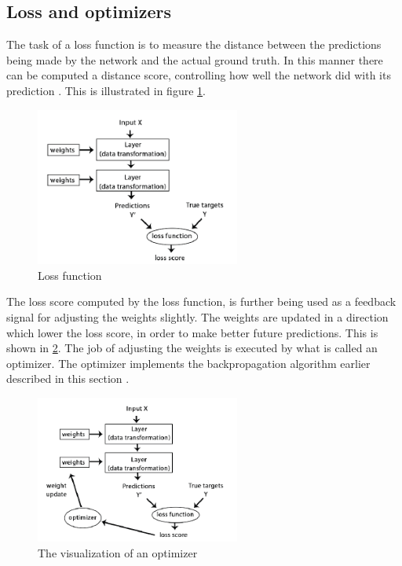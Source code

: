 \documentclass[USenglish]{ifimaster}  %
\begin{document}
\subsection{Loss and optimizers}
The task of a loss function is to measure the distance between the predictions being made by the network and the actual ground truth. In this manner there can be computed a distance score, controlling how well the network did with its prediction \cite{Francois_Deep_learning_with_python}. This is illustrated in figure \cref{fig:loss_function}.

\begin{figure}[ht]
    \centering
    \includegraphics[width=0.6\textwidth]{bilder/loss_function.png}
    \caption{Loss function \cite{Francois_Deep_learning_with_python}}
    \label{fig:loss_function}
\end{figure}
The loss score computed by the loss function, is further being used as a feedback signal for adjusting the weights slightly. The weights are updated in a direction which lower the loss score, in order to make better future predictions. This is shown in \cref{fig:optimizers}. The job of adjusting the weights is executed by what is called an optimizer. The optimizer implements the backpropagation algorithm earlier described in this section \cite{Francois_Deep_learning_with_python}. 

\begin{figure}[ht]
    \centering
    \includegraphics[width=0.6\textwidth]{bilder/optimizers.png}
    \caption{The visualization of an optimizer \cite{Francois_Deep_learning_with_python}}
    \label{fig:optimizers}
\end{figure}
\end{document}
